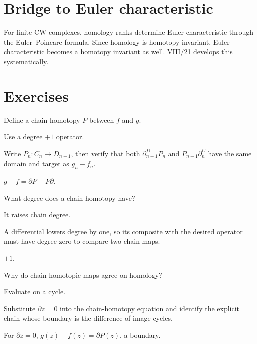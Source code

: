 \section{Bridge to Euler characteristic}

For finite CW complexes, homology ranks determine Euler characteristic through
the Euler--Poincare formula.  Since homology is homotopy invariant, Euler
characteristic becomes a homotopy invariant as well.  VIII/21 develops this
systematically.


\section{Exercises}

\begin{exercise}\label{exr:viii20-01}
Define a chain homotopy \(P\) between \(f\) and \(g\).
\end{exercise}
\begin{hint}
Use a degree \(+1\) operator.

Write \(P_n:C_n\to D_{n+1}\), then verify that both \(\partial^D_{n+1}P_n\) and \(P_{n-1}\partial^C_n\) have the same domain and target as \(g_n-f_n\).
\end{hint}
\begin{solution}
\(g-f=\partial P+P\partial\).
\end{solution}

\begin{exercise}\label{exr:viii20-02}
What degree does a chain homotopy have?
\end{exercise}
\begin{hint}
It raises chain degree.

A differential lowers degree by one, so its composite with the desired operator must have degree zero to compare two chain maps.
\end{hint}
\begin{solution}
\(+1\).
\end{solution}

\begin{exercise}\label{exr:viii20-03}
Why do chain-homotopic maps agree on homology?
\end{exercise}
\begin{hint}
Evaluate on a cycle.

Substitute \(\partial z=0\) into the chain-homotopy equation and identify the explicit chain whose boundary is the difference of image cycles.
\end{hint}
\begin{solution}
For \(\partial z=0\), \(g(z)-f(z)=\partial P(z)\), a boundary.
\end{solution}

